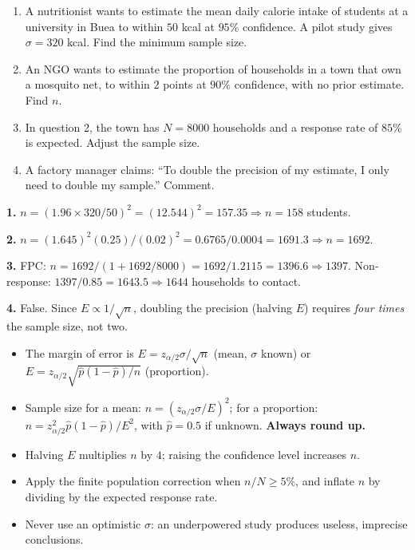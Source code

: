 \documentclass[11pt]{article}
\newcommand{\cle}[1]{{\popxbold\color{popdark}#1}}
\begin{document}
\begin{exercice}[Practice]
\begin{enumerate}
\item A nutritionist wants to estimate the mean daily calorie intake of students at a university in Buea to within $50$ kcal at $95\%$ confidence. A pilot study gives $\sigma = 320$ kcal. Find the minimum sample size.
\item An NGO wants to estimate the proportion of households in a town that own a mosquito net, to within $2$ points at $90\%$ confidence, with no prior estimate. Find $n$.
\item In question 2, the town has $N = 8000$ households and a response rate of $85\%$ is expected. Adjust the sample size.
\item A factory manager claims: ``To double the precision of my estimate, I only need to double my sample.'' Comment.
\end{enumerate}
\end{exercice}

\begin{corrige}[Exercise 6.1]
\textbf{1.} $n = (1.96\times 320/50)^2 = (12.544)^2 = 157.35 \Rightarrow n = 158$ students.

\textbf{2.} $n = (1.645)^2(0.25)/(0.02)^2 = 0.6765/0.0004 = 1691.3 \Rightarrow n = 1692$.

\textbf{3.} FPC: $n = 1692/(1+1692/8000) = 1692/1.2115 = 1396.6 \Rightarrow 1397$. Non-response: $1397/0.85 = 1643.5 \Rightarrow 1644$ households to contact.

\textbf{4.} False. Since $E \propto 1/\sqrt{n}$, doubling the precision (halving $E$) requires \emph{four times} the sample size, not two.
\end{corrige}

\begin{aretenir}
\begin{itemize}
\item The \cle{margin of error} is $E = z_{\alpha/2}\sigma/\sqrt{n}$ (mean, $\sigma$ known) or $E = z_{\alpha/2}\sqrt{\hat p(1-\hat p)/n}$ (proportion).
\item Sample size for a mean: $n = \left(z_{\alpha/2}\sigma/E\right)^2$; for a proportion: $n = z_{\alpha/2}^2\hat p(1-\hat p)/E^2$, with $\hat p = 0.5$ if unknown. \textbf{Always round up.}
\item Halving $E$ multiplies $n$ by $4$; raising the confidence level increases $n$.
\item Apply the finite population correction when $n/N \ge 5\%$, and inflate $n$ by dividing by the expected response rate.
\item Never use an optimistic $\sigma$: an underpowered study produces useless, imprecise conclusions.
\end{itemize}
\end{aretenir}
\end{document}
